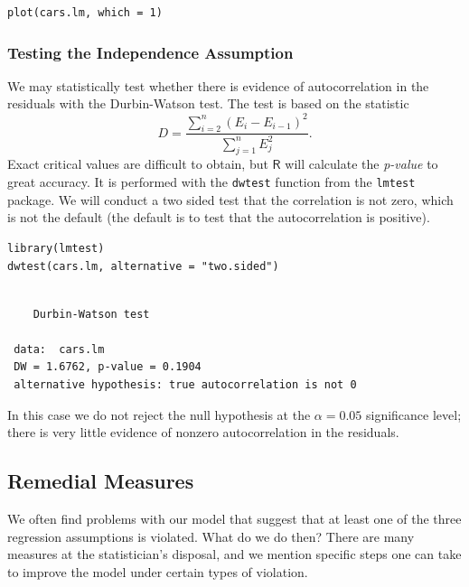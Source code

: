 \documentclass[captions=tableheading]{scrbook}
\begin{document}
\lstset{language=R}
\begin{lstlisting}
plot(cars.lm, which = 1)
\end{lstlisting}
\subsubsection{Testing the Independence Assumption}
\label{sec-11-4-3-1}


We may statistically test whether there is evidence of autocorrelation in the residuals with the Durbin-Watson test. The test is based on the statistic
\begin{equation}
D=\frac{\sum_{i=2}^{n}(E_{i}-E_{i-1})^{2}}{\sum_{j=1}^{n}E_{j}^{2}}.
\end{equation}
Exact critical values are difficult to obtain, but \(\mathsf{R}\) will calculate the \emph{p-value} to great accuracy. It is performed with the \texttt{dwtest} function from the \texttt{lmtest} package. We will conduct a two sided test that the correlation is not zero, which is not the default (the default is to test that the autocorrelation is positive).


\lstset{language=R}
\begin{lstlisting}
library(lmtest)
dwtest(cars.lm, alternative = "two.sided")
\end{lstlisting}

\begin{verbatim}
 
 	Durbin-Watson test
 
 data:  cars.lm 
 DW = 1.6762, p-value = 0.1904
 alternative hypothesis: true autocorrelation is not 0
\end{verbatim}

In this case we do not reject the null hypothesis at the \(\alpha=0.05\) significance level; there is very little evidence of nonzero autocorrelation in the residuals.
\subsection{Remedial Measures}
\label{sec-11-4-4}


We often find problems with our model that suggest that at least one of the three regression assumptions is violated. What do we do then? There are many measures at the statistician's disposal, and we mention specific steps one can take to improve the model under certain types of violation.
\end{document}
